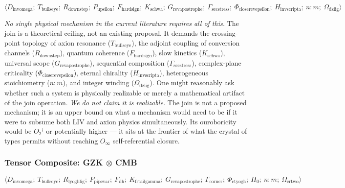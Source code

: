 \documentclass[12pt,a4paper]{article}
\begin{document}
\[\langle D_{\text{invomega}};\ T_{\text{bullseye}};\ R_{\text{downstep}};\ P_{\text{upsilon}};\ F_{\text{hardsign}};\ K_{\text{schwa}};\ G_{\text{revapostrophe}};\ \Gamma_{\text{secstress}};\ \Phi_{\text{closerevepsilon}};\ H_{\text{invscripta}};\ n{:}m;\ \Omega_{\text{dzlig}} \rangle\]

\emph{No single physical mechanism in the current literature requires all of this.} The join is a theoretical ceiling, not an existing proposal. It demands the crossing-point topology of axion resonance ($T_{\text{bullseye}}$), the adjoint coupling of conversion channels ($R_{\text{downstep}}$), quantum coherence ($F_{\text{hardsign}}$), slow kinetics ($K_{\text{schwa}}$), universal scope ($G_{\text{revapostrophe}}$), sequential composition ($\Gamma_{\text{secstress}}$), complex-plane criticality ($\Phi_{\text{closerevepsilon}}$), eternal chirality ($H_{\text{invscripta}}$), heterogeneous stoichiometry ($n{:}m$), and integer winding ($\Omega_{\text{dzlig}}$). One might reasonably ask whether such a system is physically realizable or merely a mathematical artifact of the join operation. \emph{We do not claim it is realizable.} The join is not a proposed mechanism; it is an upper bound on what a mechanism would need to be if it were to subsume both LIV and axion physics simultaneously. Its ouroboricity would be $O₂^\dagger$ or potentially higher --- it sits at the frontier of what the crystal of types permits without reaching $O_{\infty}$ self-referential closure.

\subsubsection{Tensor Composite: GZK $\otimes$ CMB}

\[\langle D_{\text{invomega}};\ T_{\text{bullseye}};\ R_{\text{lyoghlig}};\ P_{\text{pipevar}};\ F_{\text{dh}};\ K_{\text{frtailgamma}};\ G_{\text{revapostrophe}};\ \Gamma_{\text{corner}};\ \Phi_{\text{ctyogh}};\ H_0;\ n{:}m;\ \Omega_{\text{crtwo}} \rangle\]
\end{document}
